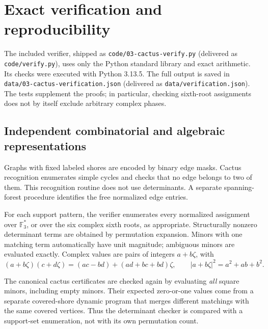 \documentclass[11pt]{article}
\numberwithin{equation}{section}
\theoremstyle{definition}
\newcommand{\F}{\mathbb F}
\begin{document}
\section{Exact verification and reproducibility}
\label{cac:sec:verification}

The included verifier, shipped as \nolinkurl{code/03-cactus-verify.py} (delivered as \texttt{code/verify.py}), uses only the Python standard library and exact arithmetic. Its checks were executed with Python 3.13.5. The full output is saved in \nolinkurl{data/03-cactus-verification.json} (delivered as \texttt{data/verification.json}). The tests supplement the proofs; in particular, checking sixth-root assignments does not by itself exclude arbitrary complex phases.

\subsection{Independent combinatorial and algebraic representations}
Graphs with fixed labeled shores are encoded by binary edge masks. Cactus recognition enumerates simple cycles and checks that no edge belongs to two of them. This recognition routine does not use determinants. A separate spanning-forest procedure identifies the free normalized edge entries.

For each support pattern, the verifier enumerates every normalized assignment over $\F_3^*$, or over the six complex sixth roots, as appropriate. Structurally nonzero determinant terms are obtained by permutation expansion. Minors with one matching term automatically have unit magnitude; ambiguous minors are evaluated exactly. Complex values are pairs of integers $a+b\zeta$, with
\[
 (a+b\zeta)(c+d\zeta)=(ac-bd)+(ad+bc+bd)\zeta,
 \qquad |a+b\zeta|^2=a^2+ab+b^2.
\]

The canonical cactus certificates are checked again by evaluating \emph{all} square minors, including empty minors. Their expected zero-or-one values come from a separate covered-shore dynamic program that merges different matchings with the same covered vertices. Thus the determinant checker is compared with a support-set enumeration, not with its own permutation count.
\end{document}
